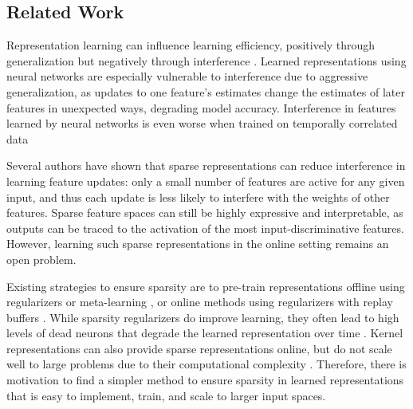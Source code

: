 \documentclass{article}
\begin{document}
\subsection{Related Work} \label{sub-sec:related work}
Representation learning can influence learning efficiency, positively through generalization but negatively through interference \cite[]{bullinaria1995, iCaRL2016, le2017, liu2019}.
Learned representations using neural networks are especially vulnerable to interference due to aggressive generalization, as updates to one feature’s estimates change the estimates of later features in unexpected ways, degrading model accuracy.
Interference in features learned by neural networks is even worse when trained on temporally correlated data \cite[]{liu2020, bengio2020, zhang2022}

Several authors \cite[]{ghiassian2020,liu2019,javed2019,sutton2019}
have shown that sparse representations can reduce interference in learning feature updates: only a small number of features are active for any given input,
and thus each update is less likely to interfere with the weights of other features. Sparse feature spaces can still be highly expressive and interpretable,
as outputs can be traced to the activation of the most input-discriminative features.
However, learning such sparse representations in the online setting remains an open problem.

Existing strategies to ensure sparsity are to pre-train representations offline using regularizers \cite[]{liu2019} or meta-learning \cite{javed2019},
or online methods using regularizers with replay buffers \cite{sutton2019}. While sparsity regularizers do improve learning, they often lead to high levels of dead neurons that degrade the learned representation over time \cite[]{sutton2019}.
Kernel representations can also provide sparse representations online, but do not scale well to large problems due to their computational complexity \cite[]{pan2019fuzzy}.
Therefore, there is motivation to find a simpler method to ensure sparsity in learned representations that is easy to implement, train, and scale to larger input spaces.
\end{document}
